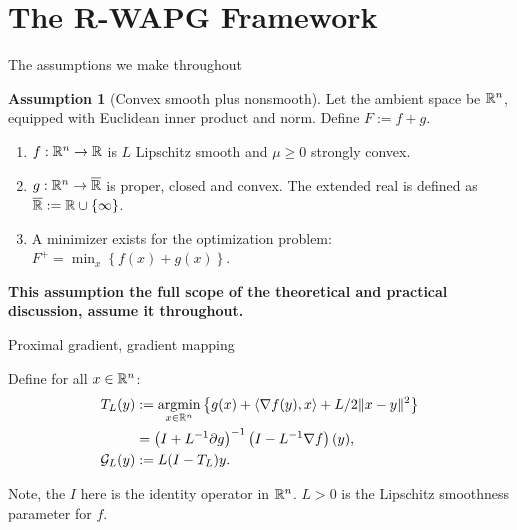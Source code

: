 \documentclass[11pt]{beamer}
\theoremstyle{definition}
\newtheorem{assumption}{Assumption}[section]
\begin{document}
\section{The R-WAPG Framework}
    \begin{frame}{The assumptions we make throughout}
        \begin{assumption}[Convex smooth plus nonsmooth]
            Let the ambient space be $\mathbb R^n$, equipped with Euclidean inner product and norm. 
            Define $F := f + g$.
            \begin{enumerate}
                \item $f: \mathbb R^n \rightarrow \mathbb R$ is $L$ Lipschitz smooth and $\mu \ge 0$ strongly convex.
                \item $g: \mathbb R^n \rightarrow \overline {\mathbb R}$ is proper, closed and convex. The extended real is defined as $\overline {\mathbb R} := \mathbb R \cup \{\infty\}$.
                \item A minimizer exists for the optimization problem: $F^+ = \min_x \left\lbrace f(x) + g(x)\right\rbrace$.
            \end{enumerate}
        \end{assumption}
        \textbf{This assumption the full scope of the theoretical and practical discussion, assume it throughout.}
    \end{frame}
    \begin{frame}{Proximal gradient, gradient mapping}
        \begin{definition}
            Define for all $x\in \mathbb R^n$: 
            \begin{align*}
                T_L(y) 
                &:= \mathop{\rm argmin}\limits_{x \in \mathbb R^n} \left\lbrace
                    g(x) + \langle \nabla f(y), x\rangle + L/2\Vert x - y\Vert^2
                \right\rbrace 
                \\
                &= \left(I + L^{-1}\partial g\right)^{-1}
                \left(I - L^{-1}\nabla f\right)(y),
                \\
                \mathcal G_L(y)
                &:= L(I - T_L)y.
            \end{align*}
        \end{definition}
        Note, the $I$ here is the identity operator in $\mathbb R^n$. 
        $L > 0$ is the Lipschitz smoothness parameter for $f$. 
    \end{frame}
\end{document}
